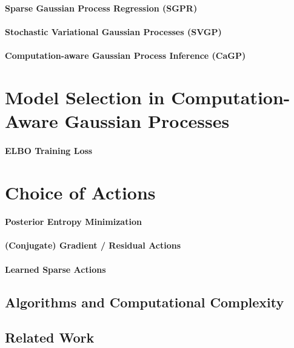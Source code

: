 \documentclass{article}
\begin{document}
\paragraph{Sparse Gaussian Process Regression (SGPR) \cite{Titsias2009}}

\paragraph{Stochastic Variational Gaussian Processes (SVGP) \cite{Hensman2013}}

\paragraph{Computation-aware Gaussian Process Inference (CaGP) \cite{Wenger2022PosteriorComputational}}

\section{Model Selection in Computation-Aware Gaussian Processes}

\paragraph{ELBO Training Loss}

\section{Choice of Actions}

\paragraph{Posterior Entropy Minimization}

\paragraph{(Conjugate) Gradient / Residual Actions}

\paragraph{Learned Sparse Actions}


\subsection{Algorithms and Computational Complexity}


\subsection{Related Work}
\end{document}

